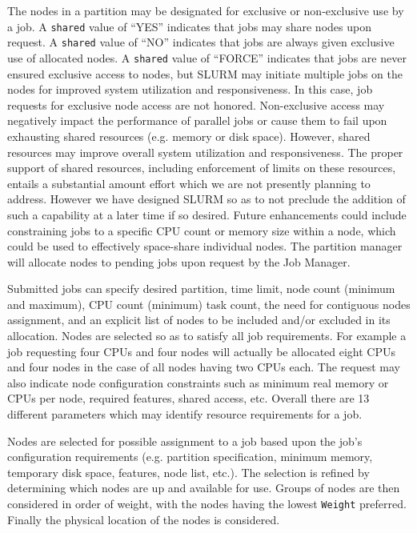 \documentclass[10pt,onecolumn,times]{../common/llncs}
\begin{document}
{The nodes in a partition may be designated for exclusive or non-exclusive
use by a job.  A {\tt shared} value of ``YES'' indicates that jobs may
share nodes upon request.  A {\tt shared} value of ``NO'' indicates that
jobs are always given exclusive use of allocated nodes.  A {\tt shared}
value of ``FORCE'' indicates that jobs are never ensured exclusive
access to nodes, but SLURM may initiate multiple jobs on the nodes
for improved system utilization and responsiveness.  In this case,
job requests for exclusive node access are not honored.  Non-exclusive
access may negatively impact the performance of parallel jobs or cause
them to fail upon exhausting shared resources (e.g. memory or disk
space). However, shared resources may improve overall system utilization
and responsiveness. The proper support of shared resources, including
enforcement of limits on these resources, entails a substantial amount
effort which we are not presently planning to address.  However we have
designed SLURM so as to not preclude the addition of such a capability
at a later time if so desired.  Future enhancements could include
constraining jobs to a specific CPU count or memory size within a
node, which could be used to effectively space-share individual nodes.
The partition manager will allocate nodes to pending jobs upon request
by the Job Manager.

Submitted jobs can specify desired partition, time limit, node count
(minimum and maximum), CPU count (minimum) task count, the need for
contiguous nodes assignment, and an explicit list of nodes to be included
and/or excluded in its allocation.  Nodes are selected so as to satisfy
all job requirements.  For example a job requesting four CPUs and four
nodes will actually be allocated eight CPUs and four nodes in the case
of all nodes having two CPUs each.  The request may also indicate node
configuration constraints such as minimum real memory or CPUs per node,
required features, shared access, etc.  Overall there are 13 different
parameters which may identify resource requirements for a job.

Nodes are selected for possible assignment to a job based upon the
job's configuration requirements (e.g. partition specification, minimum
memory, temporary disk space, features, node list, etc.).  The selection
is refined by determining which nodes are up and available for use.
Groups of nodes are then considered in order of weight, with the nodes
having the lowest {\tt Weight} preferred.  Finally the physical location
of the nodes is considered.

}
\end{document}
